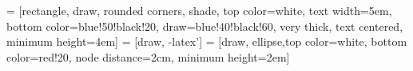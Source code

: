  = [rectangle, draw, rounded corners, shade, top color=white, text width=5em,
  bottom color=blue!50!black!20, draw=blue!40!black!60, very thick, text centered, minimum height=4em]
   = [draw, -latex']
   = [draw, ellipse,top color=white, bottom color=red!20, node distance=2cm, minimum height=2em]

  \frame{\titlepage}



\let\tempone\itemize
\let\temptwo\enditemize
\renewenvironment{itemize}{\tempone\addtolength{\itemsep}{0.5\baselineskip}}{\temptwo}